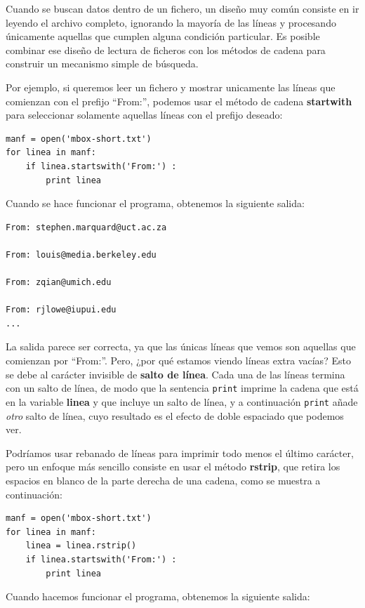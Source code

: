 Cuando se buscan datos dentro de un fichero, un
diseño muy común consiste en ir leyendo el archivo completo, ignorando
la mayoría de las líneas y procesando únicamente aquellas que cumplen alguna condición
particular. Es posible combinar ese diseño de lectura de ficheros con los métodos de cadena
para construir un mecanismo simple de búsqueda.

Por ejemplo, si queremos leer un fichero y mostrar unicamente las líneas
que comienzan con el prefijo ``From:'', podemos usar el
método de cadena {\bf startwith} para seleccionar solamente aquellas líneas con
el prefijo deseado:

\beforeverb
\begin{verbatim}
manf = open('mbox-short.txt')
for linea in manf:
    if linea.startswith('From:') :
        print linea
\end{verbatim}
\afterverb
%
Cuando se hace funcionar el programa, obtenemos la siguiente salida:

\beforeverb
\begin{verbatim}
From: stephen.marquard@uct.ac.za

From: louis@media.berkeley.edu

From: zqian@umich.edu

From: rjlowe@iupui.edu
...
\end{verbatim}
\afterverb
%
La salida parece ser correcta, ya que las únicas líneas que vemos son aquellas
que comienzan por ``From:''. Pero, ¿por qué estamos viendo líneas extra
vacías? Esto se debe al carácter invisible de {\bf salto de línea}.
Cada una de las líneas termina con un salto de línea, de modo que la sentencia
{\tt print} imprime la cadena que está en la variable {\bf linea} y que
incluye un salto de línea, y a continuación {\tt print} añade \emph{otro} salto de línea,
cuyo resultado es el efecto de doble espaciado que podemos ver.

Podríamos usar rebanado de líneas para imprimir todo menos el último carácter, pero
un enfoque más sencillo consiste en usar el método {\bf rstrip}, que retira
los espacios en blanco de la parte derecha de una cadena, como se muestra a continuación:

\beforeverb
\begin{verbatim}
manf = open('mbox-short.txt')
for linea in manf:
    linea = linea.rstrip()
    if linea.startswith('From:') :
        print linea
\end{verbatim}
\afterverb
%
Cuando hacemos funcionar el programa, obtenemos la siguiente salida:


